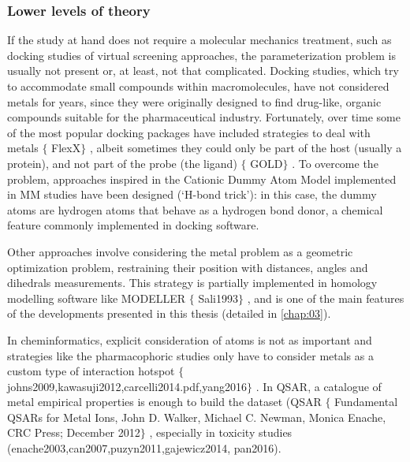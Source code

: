 \subsubsection{Lower levels of theory}
If the study at hand does not require a molecular mechanics treatment, such as docking studies of virtual screening approaches, the parameterization problem is usually not present or, at least, not that complicated. Docking studies, which try to accommodate small compounds within macromolecules, have not considered metals for years, since they were originally designed to find drug-like, organic compounds suitable for the pharmaceutical industry. Fortunately, over time some of the most popular docking packages have included strategies to deal with metals $ \{ $ FlexX$ \} $ , albeit sometimes they could only be part of the host (usually a protein), and not part of the probe (the ligand) $ \{ $ GOLD$ \} $ . To overcome the problem, approaches inspired in the Cationic Dummy Atom Model implemented in MM studies have been designed (‘H-bond trick’): in this case, the dummy atoms are hydrogen atoms that behave as a hydrogen bond donor, a chemical feature commonly implemented in docking software.

Other approaches involve considering the metal problem as a geometric optimization problem, restraining their position with distances, angles and dihedrals measurements. This strategy is partially implemented in homology modelling software like MODELLER $ \{ $ Sali1993$ \} $ , and is one of the main features of the developments presented in this thesis (detailed in \autoref{chap:03}).

In cheminformatics, explicit consideration of atoms is not as important and strategies like the pharmacophoric studies only have to consider metals as a custom type of interaction hotspot $ \{ $ johns2009,kawasuji2012,carcelli2014.pdf,yang2016$ \} $ . In QSAR, a catalogue of metal empirical properties is enough to build the dataset (QSAR $ \{ $ Fundamental QSARs for Metal Ions, John D. Walker, Michael C. Newman, Monica Enache, CRC Press; December 2012$ \} $ , especially in toxicity studies (enache2003,can2007,puzyn2011,gajewicz2014, pan2016).

\cite{Eigen1971}